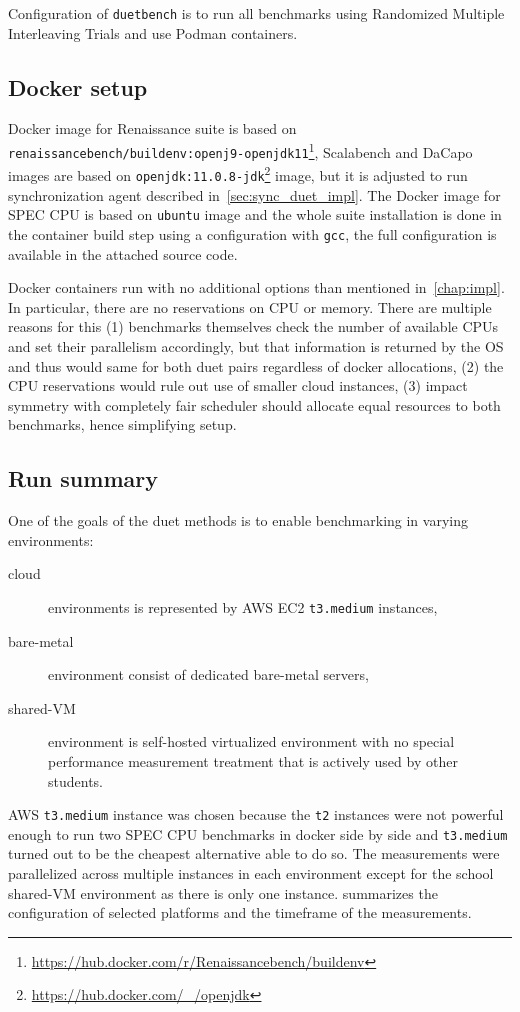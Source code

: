 Configuration of \lstinline{duetbench} is to run all benchmarks using Randomized Multiple Interleaving Trials and use Podman containers.

\subsection{Docker setup}
Docker image for Renaissance suite is based on \lstinline{renaissancebench/buildenv:openj9-openjdk11}\footnote{\url{https://hub.docker.com/r/Renaissancebench/buildenv}}, Scalabench and DaCapo images are based on \lstinline{openjdk:11.0.8-jdk}\footnote{\url{https://hub.docker.com/_/openjdk}} image, but it is adjusted to run synchronization agent described in~\cref{sec:sync_duet_impl}.
The Docker image for SPEC CPU is based on \lstinline{ubuntu} image and the whole suite installation is done in the container build step using a configuration with \lstinline{gcc}, the full configuration is available in the attached source code.

Docker containers run with no additional options than mentioned in~\cref{chap:impl}.
In particular, there are no reservations on CPU or memory.
There are multiple reasons for this (1) benchmarks themselves check the number of available CPUs and set their parallelism accordingly, but that information is returned by the OS and thus would same for both duet pairs regardless of docker allocations, (2) the CPU reservations would rule out use of smaller cloud instances, (3) impact symmetry with completely fair scheduler should allocate equal resources to both benchmarks, hence simplifying setup.

\subsection{Run summary}

One of the goals of the duet methods is to enable benchmarking in varying environments:
\begin{description}
	\item[cloud] environments is represented by AWS EC2 \lstinline{t3.medium} instances,
	\item[bare-metal] environment consist of dedicated \mbox{bare-metal} servers,
	\item[shared-VM] environment is \mbox{self-hosted} virtualized environment with no special performance measurement treatment that is actively used by other students.
\end{description}
AWS \lstinline{t3.medium} instance was chosen because the \lstinline{t2} instances were not powerful enough to run two SPEC CPU benchmarks in docker side by side and \lstinline{t3.medium} turned out to be the cheapest alternative able to do so.
The measurements were parallelized across multiple instances in each environment except for the school \mbox{shared-VM} environment as there is only one instance.
 summarizes the configuration of selected platforms and the timeframe of the measurements.


